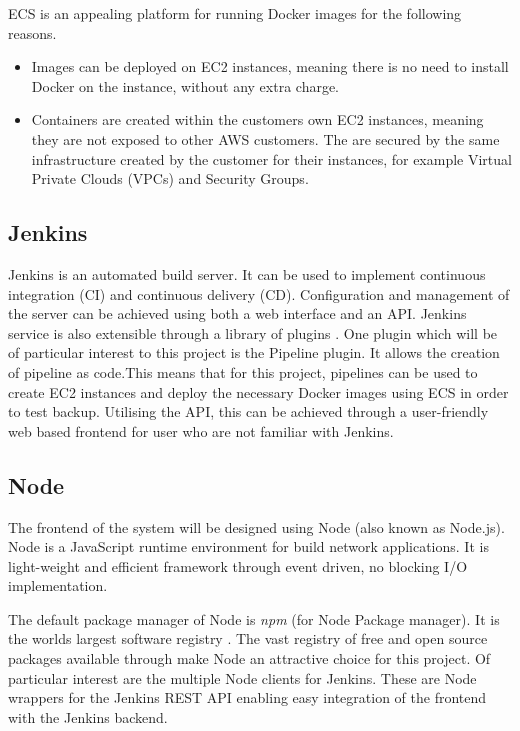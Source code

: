 ECS is an appealing platform for running Docker images for the following reasons.
\begin{itemize}
	\item Images can be deployed on EC2 instances, meaning there is no need to install Docker on the instance, without any extra charge.
	\item Containers are created within the customers own EC2 instances, meaning they are not exposed to other AWS customers. The are secured by the same infrastructure created by the customer for their instances, for example Virtual Private Clouds (VPCs) and Security Groups.
	
\end{itemize}


\subsection{Jenkins}
Jenkins is an automated build server. It can be used to implement continuous integration (CI) and continuous delivery (CD). Configuration and management of the server can be achieved using both a web interface and an API. Jenkins service is also extensible through a library of plugins \citep{jenkins}. One plugin which will be of particular interest to this project is the Pipeline plugin. It allows the creation of pipeline as code.This means that for this project, pipelines can be used to create EC2 instances and deploy the necessary Docker images using ECS in order to test backup. Utilising the API, this can be achieved through a user-friendly web based frontend for user who are not familiar with Jenkins.

\subsection{Node}
The frontend of the system will be designed using Node (also known as Node.js). Node is a JavaScript runtime environment for build network applications. It is light-weight and efficient framework through  event driven, no blocking I/O implementation. 

The default package manager of Node is \textit{npm} (for Node Package manager). It is the worlds largest software registry \citep{npm}. The vast registry of free and open source packages available through make Node an attractive choice for this project. Of particular interest are the multiple Node clients for Jenkins. These are Node wrappers for the Jenkins REST API enabling easy integration of the frontend with the Jenkins backend.

